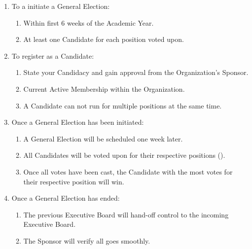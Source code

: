 \begin{enumerate}
	\item To a initiate a General Election:
		\begin{enumerate}
			\item Within first 6 weeks of the Academic Year.

			\item At least one Candidate for each position voted upon.
		\end{enumerate}

	\item To register as a Candidate:
		\begin{enumerate}
			\item State your Candidacy and gain approval from the Organization's Sponsor.

			\item Current Active Membership within the Organization.

			\item A Candidate can not run for multiple positions at the same time.
		\end{enumerate}

	\item Once a General Election has been initiated:
		\begin{enumerate}
			\item A General Election will be scheduled one week later.

			\item All Candidates will be voted upon for their respective positions ().

			\item Once all votes have been cast, the Candidate with the most votes for
				their respective position will win.
		\end{enumerate}

	\item Once a General Election has ended:
		\begin{enumerate}
			\item The previous Executive Board will hand-off control to the incoming Executive
				Board.

			\item The Sponsor will verify all goes smoothly.
		\end{enumerate}
\end{enumerate}

